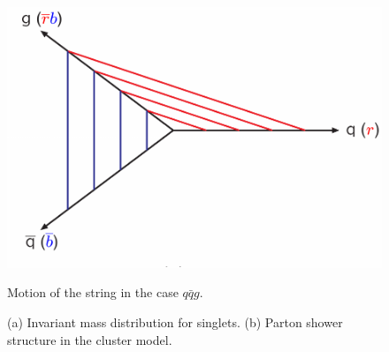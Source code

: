 \begin{figure}
\centering%
{\includegraphics[scale= 0.5]{../Cap3/Fig_MC/stringtwo22}}
\caption{Motion of the string in the case $q \bar{q}g$.}
\label{tubo3}
\end{figure}

\begin{figure}
\centering%
\caption{(a)  Invariant mass distribution for singlets. (b) Parton shower structure in the cluster model.}
\label{tubo2}
\end{figure}


